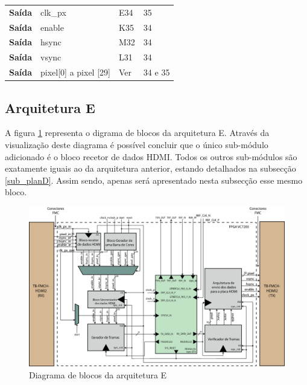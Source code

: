 \documentclass[11pt,a4paper]{article}
\begin{document}
\begin{table}[h!]
\begin{tabular}{rlll}
			\multicolumn{1}{r|}{\textbf{Saída}}   & clk\_px                            & E34                                      & 35                                         \\
			\multicolumn{1}{r|}{\textbf{Saída}}   & enable                             & K35                                      & 34                                         \\
			\multicolumn{1}{r|}{\textbf{Saída}}   & hsync                              & M32                                      & 34                                         \\
			\multicolumn{1}{r|}{\textbf{Saída}}   & vsync                              & L31                                      & 34                                         \\
			\multicolumn{1}{r|}{\textbf{Saída}}   & pixel{[}0{]} a pixel {[}29{]}      & Ver \cite{R041}                                & 34 e 35                                    \\ \hline
		\end{tabular}%
	\end{table}
	
	
	\subsection{Arquitetura E}
		A figura \ref{fig:planoE} representa o digrama de blocos da arquitetura E. Através da visualização deste diagrama é possível concluir que o único sub-módulo adicionado é o bloco recetor de dados HDMI. Todos os outros sub-módulos são exatamente iguais ao da arquitetura anterior, estando detalhados na subsecção \ref{sub_planD}. Assim sendo, apenas será apresentado nesta subsecção esse mesmo bloco.
		\begin{figure}[h!]
			\begin{center}
			\includegraphics[width=1.0\textwidth]{planoE} 
			\caption{Diagrama de blocos da arquitetura E}
			\label{fig:planoE}
		\end{center}
		\end{figure}
\end{document}

